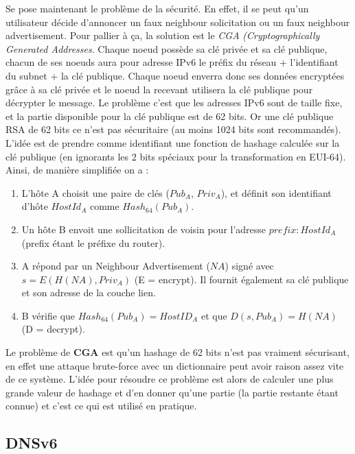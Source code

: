 \documentclass{article}
\newcommand{\term}[1]{\textit{\textcolor{maintitle}{#1}}}
\begin{document}
\begin{sffamily}
Se pose maintenant le problème de la sécurité. En effet, il se peut qu'un utilisateur décide d'annoncer un faux neighbour 
solicitation ou un faux neighbour advertisement. Pour pallier à ça, la solution est le \term{CGA} \textit{(Cryptographically 
Generated Addresses}. Chaque noeud possède sa clé privée et sa clé publique, chacun de ses noeuds aura pour adresse IPv6 le 
préfix du réseau + l'identifiant du subnet + la clé publique. Chaque noeud enverra donc ses données encryptées grâce à sa clé 
privée et le noeud la recevant utilisera la clé publique pour décrypter le message. Le problème c'est que les adresses IPv6 sont 
de taille fixe, et la partie disponible pour la clé publique est de 62 bits. Or une clé publique RSA de 62 bits ce n'est pas 
sécuritaire (au moins 1024 bits sont recommandés). L'idée est de prendre comme identifiant une fonction de hashage calculée sur 
la clé publique (en ignorants les 2 bits spéciaux pour la transformation en EUI-64). Ainsi, de manière simplifiée on a :
\begin{enumerate}
\item L'hôte A choisit une paire de clés ($Pub_A$, $Priv_A$), et définit son identifiant d'hôte $HostId_A$ comme $Hash_{64}
(Pub_A)$.
\item Un hôte B envoit une sollicitation de voisin pour l'adresse $prefix:HostId_A$ (prefix étant le préfixe du router).
\item A répond par un Neighbour Advertisement ($NA$) signé avec $s = E(H(NA),Priv_A)$ (E = encrypt). Il fournit également sa 
clé publique et son adresse de la couche lien.
\item B vérifie que $Hash_{64}(Pub_A) = HostID_A$ et que $D(s,Pub_A) = H(NA)$ (D = decrypt).
\end{enumerate}

Le problème de \textbf{CGA} est qu'un hashage de 62 bits n'est pas vraiment sécurisant, en effet une attaque brute-force avec un
dictionnaire peut avoir raison assez vite de ce système. L'idée pour résoudre ce problème est alors de calculer une plus grande
valeur de hashage et d'en donner qu'une partie (la partie restante étant connue) et c'est ce qui est utilisé en pratique.

\subsection{DNSv6}


\end{sffamily}
\end{document}
